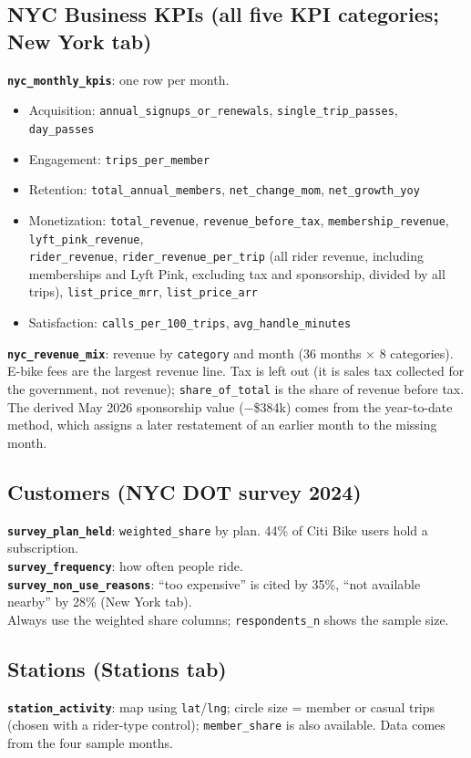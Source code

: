 \documentclass[11pt,a4paper]{article}
\newcommand{\f}[1]{\texttt{\small #1}}
\begin{document}
\subsection{NYC Business KPIs (all five KPI categories; New York tab)}
\textbf{\f{nyc\_monthly\_kpis}}: one row per month.
\begin{itemize}
\item Acquisition: \f{annual\_signups\_or\_renewals}, \f{single\_trip\_passes}, \f{day\_passes}
\item Engagement: \f{trips\_per\_member}
\item Retention: \f{total\_annual\_members}, \f{net\_change\_mom}, \f{net\_growth\_yoy}
\item Monetization: \f{total\_revenue}, \f{revenue\_before\_tax}, \f{membership\_revenue}, \f{lyft\_pink\_revenue},\\ \f{rider\_revenue}, \f{rider\_revenue\_per\_trip} (all rider revenue, including memberships and Lyft Pink, excluding tax and sponsorship, divided by all trips), \f{list\_price\_mrr}, \f{list\_price\_arr}
\item Satisfaction: \f{calls\_per\_100\_trips}, \f{avg\_handle\_minutes}
\end{itemize}
\textbf{\f{nyc\_revenue\_mix}}: revenue by \f{category} and month (36 months $\times$ 8 categories). E-bike fees are the largest revenue line. Tax is left out (it is sales tax collected for the government, not revenue); \f{share\_of\_total} is the share of revenue before tax. The derived May 2026 sponsorship value ($-$\$384k) comes from the year-to-date method, which assigns a later restatement of an earlier month to the missing month.

\subsection{Customers (NYC DOT survey 2024)}
\textbf{\f{survey\_plan\_held}}: \f{weighted\_share} by plan. 44\% of Citi Bike users hold a subscription.\\
\textbf{\f{survey\_frequency}}: how often people ride.\\
\textbf{\f{survey\_non\_use\_reasons}}: ``too expensive'' is cited by 35\%, ``not available nearby'' by 28\% (New York tab).\\
Always use the weighted share columns; \f{respondents\_n} shows the sample size.

\subsection{Stations (Stations tab)}
\textbf{\f{station\_activity}}: map using \f{lat}/\f{lng}; circle size = member or casual trips (chosen with a rider-type control); \f{member\_share} is also available. Data comes from the four sample months.
\end{document}

